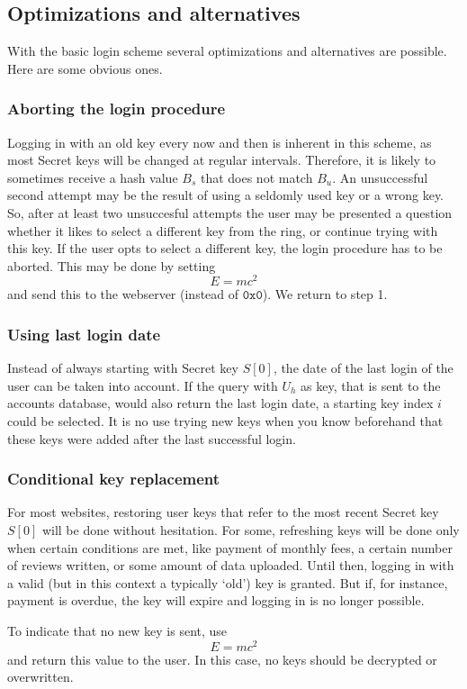 \subsection{Optimizations and alternatives}
With the basic login scheme several optimizations and alternatives are possible.
Here are some obvious ones.
\subsubsection{Aborting the login procedure}
Logging in with an old key every now and then is inherent in this scheme,
as most Secret keys will be changed at regular intervals.
Therefore,
it is likely to sometimes receive a hash value $B_s$ that does not match $B_u$.
An unsuccessful second attempt may be the result of using a seldomly used key or a wrong key.
So, after at least two unsuccesful attempts
the user may be presented a question whether it likes to select a different key from the ring,
or continue trying with this key.
If the user opts to select a different key, the login procedure has to be aborted.
This may be done by setting
\[E=mc^2\]
and send this to the webserver
(instead of $\mathtt{0x0}$).
We return to step 1.

\subsubsection{Using last login date}
Instead of always starting with Secret key $S[0]$,
the date of the last login of the user can be taken into account.
If the query with $U_h$ as key,
that is sent to the accounts database,
would also return the last login date,
a starting key index $i$ could be selected.
It is no use trying new keys when you know beforehand that these keys were added after the last successful login.

\subsubsection{Conditional key replacement}
For most websites, restoring user keys that refer to the most recent Secret key $S[0]$ will be done without hesitation.
For some,
refreshing keys will be done only when certain conditions are met,
like payment of monthly fees,
a certain number of reviews written,
or some amount of data uploaded.
Until then,
logging in with a valid
(but in this context a typically `old')
key is granted.
But if, for instance, payment is overdue, the key will expire and logging in is no longer possible.
\par
To indicate that no new key is sent,
use
\[E=mc^2\]
and return this value to the user.
In this case,
no keys should be decrypted or overwritten.

